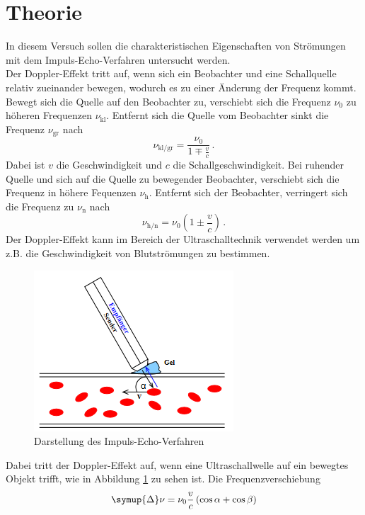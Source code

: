 \section{Theorie}
\label{sec:Theorie}
In diesem Versuch sollen die charakteristischen Eigenschaften von Strömungen mit dem Impuls-Echo-Verfahren untersucht werden.\\
Der Doppler-Effekt tritt auf, wenn sich ein Beobachter und eine Schallquelle relativ zueinander bewegen, wodurch es zu einer Änderung der Frequenz kommt.
Bewegt sich die Quelle auf den Beobachter zu, verschiebt sich die Frequenz $\nu_0$ zu höheren Frequenzen $\nu_\text{kl}$. Entfernt sich die Quelle vom Beobachter sinkt die Frequenz $\nu_\text{gr}$ nach
\begin{equation}
    \nu_\text{kl/gr}=\frac{\nu_0}{1\mp \frac{v}{c}} \, .
\end{equation}
Dabei ist $v$ die Geschwindigkeit und $c$ die Schallgeschwindigkeit.
Bei ruhender Quelle und sich auf die Quelle zu bewegender Beobachter, verschiebt sich die Frequenz in höhere Fequenzen $\nu_\text{h}$.
Entfernt sich der Beobachter, verringert sich die Frequenz zu $\nu_\text{n}$ nach 
\begin{equation}
    \nu_\text{h/n}= \nu_0 \left(1 \pm \frac{v}{c}\right) \, .
\end{equation}
Der Doppler-Effekt kann im Bereich der Ultraschalltechnik verwendet werden um z.B. die Geschwindigkeit von Blutströmungen zu bestimmen. 
\begin{figure}
    \centering
    \includegraphics[scale=0.4]{pics/Blut.png}
    \caption{Darstellung des Impuls-Echo-Verfahren \cite{v903}}
    \label{fig:IEV}
  \end{figure}
Dabei tritt der Doppler-Effekt auf, wenn eine Ultraschallwelle auf ein bewegtes Objekt trifft, wie in Abbildung \ref{fig:IEV} zu sehen ist. Die Frequenzverschiebung 
\begin{equation}
    \symup{\Delta}\nu=\nu_0 \frac{v}{c}\left(\cos \alpha + \cos \beta \right)
\end{equation}
